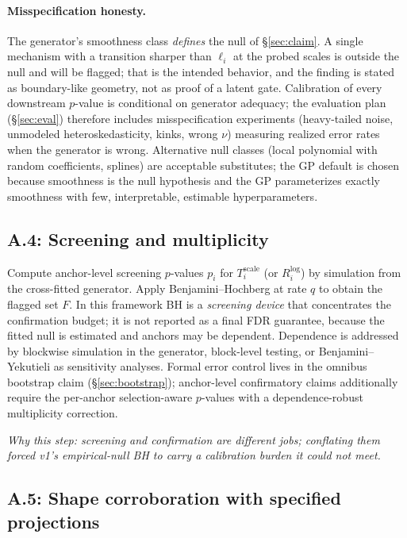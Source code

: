 \documentclass[11pt]{article}
\newcommand{\why}[1]{\par\noindent\textcolor{muted}{\small\itshape Why this step: #1}}
\begin{document}
\paragraph{Misspecification honesty.}
The generator's smoothness class \emph{defines} the null of \S\ref{sec:claim}. A single
mechanism with a transition sharper than \(\ell_i\) at the probed scales is outside the null
and will be flagged; that is the intended behavior, and the finding is stated as boundary-like
geometry, not as proof of a latent gate. Calibration of every downstream $p$-value is
conditional on generator adequacy; the evaluation plan (\S\ref{sec:eval}) therefore includes
misspecification experiments (heavy-tailed noise, unmodeled heteroskedasticity, kinks,
wrong \(\nu\)) measuring realized error rates when the generator is wrong. Alternative null
classes (local polynomial with random coefficients, splines) are acceptable substitutes; the
GP default is chosen because smoothness is the null hypothesis and the GP parameterizes
exactly smoothness with few, interpretable, estimable hyperparameters.

\subsection{A.4: Screening and multiplicity}
\label{sec:screening}

Compute anchor-level screening $p$-values \(p_i\) for \(T_i^{\mathrm{scale}}\) (or
\(R_i^{\log}\)) by simulation from the cross-fitted generator. Apply Benjamini--Hochberg at
rate \(q\) to obtain the flagged set \(F\). In this framework BH is a \emph{screening
device} that concentrates the confirmation budget; it is not reported as a final FDR
guarantee, because the fitted null is estimated and anchors may be dependent. Dependence is
addressed by blockwise simulation in the generator, block-level testing, or
Benjamini--Yekutieli as sensitivity analyses. Formal error control lives in the omnibus
bootstrap claim (\S\ref{sec:bootstrap}); anchor-level confirmatory claims additionally require
the per-anchor selection-aware $p$-values with a dependence-robust multiplicity correction.
\why{screening and confirmation are different jobs; conflating them forced v1's empirical-null
BH to carry a calibration burden it could not meet.}

\subsection{A.5: Shape corroboration with specified projections}
\label{sec:dip}
\end{document}
